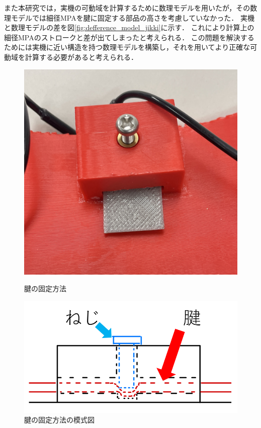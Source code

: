 また本研究では，実機の可動域を計算するために数理モデルを用いたが，その数理モデルでは細径MPAを腱に固定する部品の高さを考慮していなかった．
実機と数理モデルの差を図\ref{fig:defference_model_jikki}に示す．
これにより計算上の細径MPAのストロークと差が出てしまったと考えられる．
この問題を解決するためには実機に近い構造を持つ数理モデルを構築し，それを用いてより正確な可動域を計算する必要があると考えられる．
\begin{figure}[ht]
    \begin{minipage}[b]{0.49\hsize}
      \centering
      \includegraphics[scale=0.2]{image/kenkotei.jpg}
      \caption{腱の固定方法}
      \label{fig:ken_kotei}
    \end{minipage}
    \begin{minipage}[b]{0.49\hsize}
      \centering
      \includegraphics[scale=0.2]{image/moshiki_edited.png}
      \caption{腱の固定方法の模式図}
      \label{fig:ken_kotei_moshiki}
    \end{minipage}
\end{figure}
